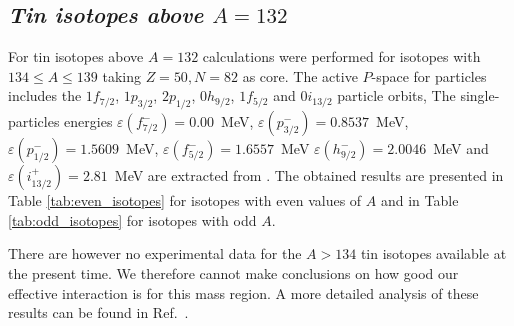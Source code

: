 \documentclass{article}
\begin{document}
\subsection{\it Tin isotopes above $A=132$}

For tin isotopes above $A=132$ calculations were performed for isotopes with $134 \le A \le 139$
taking $Z = 50, N = 82$ as core. The active $P$-space for particles includes the
$1f_{7/2}$, $1p_{3/2}$, $2p_{1/2}$, $0h_{9/2}$, $1f_{5/2}$ and $0i_{13/2}$ particle orbits,
The single-particles energies
$\varepsilon(f_{7/2}^{-}) = 0.00$~MeV,
$\varepsilon(p_{3/2}^{-}) = 0.8537$~MeV,
$\varepsilon(p_{1/2}^{-}) = 1.5609$~MeV,
$\varepsilon(f_{5/2}^{-}) = 1.6557$~MeV
$\varepsilon(h_{9/2}^{-}) = 2.0046$~MeV and
$\varepsilon(i_{13/2}^{+}) =  2.81$~MeV
are extracted from \cite{hoff96}. 
The obtained results are presented in Table \ref{tab:even_isotopes}
for isotopes with even values of $A$ and in Table \ref{tab:odd_isotopes} for isotopes with odd $A$.

There are however no experimental data for the $A > 134$ tin isotopes available at the present time.
We therefore cannot make conclusions on how good our effective interaction is for this mass
region. A more detailed analysis of these results can be found in Ref.~\cite{maximsn134}.
\end{document}

